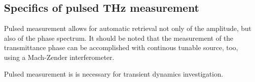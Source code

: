 \subsection{Specifics of pulsed THz measurement}
Pulsed measurement allows for automatic retrieval not only of the amplitude, but also of the phase spectrum. It should be noted that the measurement of the transmittance phase can be accomplished with continous tunable source, too, using a Mach-Zender interferometer.

Pulsed measurement is is necessary for transient dynamics investigation.


